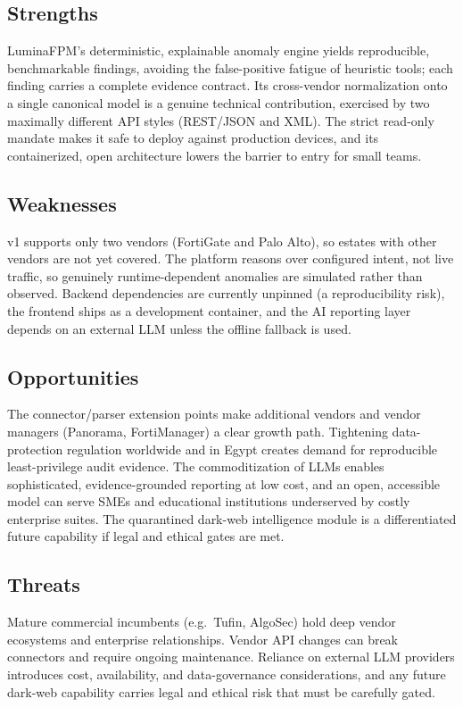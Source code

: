 \documentclass[12pt,a4paper]{report}
\renewcommand{\_}{\textunderscore\allowbreak}
\begin{document}
\subsection{Strengths}
LuminaFPM's deterministic, explainable anomaly engine yields reproducible, benchmarkable findings, avoiding the false-positive fatigue of heuristic tools; each finding carries a complete evidence contract. Its cross-vendor normalization onto a single canonical model is a genuine technical contribution, exercised by two maximally different API styles (REST/JSON and XML). The strict read-only mandate makes it safe to deploy against production devices, and its containerized, open architecture lowers the barrier to entry for small teams.

\subsection{Weaknesses}
v1 supports only two vendors (FortiGate and Palo Alto), so estates with other vendors are not yet covered. The platform reasons over configured intent, not live traffic, so genuinely runtime-dependent anomalies are simulated rather than observed. Backend dependencies are currently unpinned (a reproducibility risk), the frontend ships as a development container, and the AI reporting layer depends on an external LLM unless the offline fallback is used.

\subsection{Opportunities}
The connector/parser extension points make additional vendors and vendor managers (Panorama, FortiManager) a clear growth path. Tightening data-protection regulation worldwide and in Egypt creates demand for reproducible least-privilege audit evidence. The commoditization of LLMs enables sophisticated, evidence-grounded reporting at low cost, and an open, accessible model can serve SMEs and educational institutions underserved by costly enterprise suites. The quarantined dark-web intelligence module is a differentiated future capability if legal and ethical gates are met.

\subsection{Threats}
Mature commercial incumbents (e.g.\ Tufin, AlgoSec) hold deep vendor ecosystems and enterprise relationships. Vendor API changes can break connectors and require ongoing maintenance. Reliance on external LLM providers introduces cost, availability, and data-governance considerations, and any future dark-web capability carries legal and ethical risk that must be carefully gated.
\end{document}
